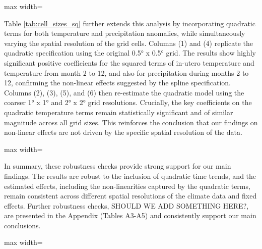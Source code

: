 \documentclass[a4paper]{article}
\begin{document}
\begin{table}[t!]
\centering
\caption{Robustness to Cell Size in Linear Fixed Effects Regression}
\label{tab:cell_sizes}
\begin{adjustbox}{max width=\linewidth}

\end{adjustbox}
\end{table}

Table \ref{tab:cell_sizes_sq} further extends this analysis by incorporating quadratic terms for both temperature and precipitation anomalies, while simultaneously varying the spatial resolution of the grid cells. Columns (1) and (4) replicate the quadratic specification using the original 0.5° x 0.5° grid.  The results show highly significant positive coefficients for the squared terms of in-utero temperature and temperature from month 2 to 12, and also for precipitation during months 2 to 12, confirming the non-linear effects suggested by the spline specification. Columns (2), (3), (5), and (6) then re-estimate the quadratic model using the coarser 1° x 1° and 2° x 2° grid resolutions. Crucially, the key coefficients on the quadratic temperature terms remain statistically significant and of similar magnitude across all grid sizes. This reinforces the conclusion that our findings on non-linear effects are not driven by the specific spatial resolution of the data.


\begin{table}[t!]
\centering
\caption{Robustness to Cell Size in Quadratic Fixed Effects Regression}
\label{tab:cell_sizes_sq}
\begin{adjustbox}{max width=\linewidth}

\end{adjustbox}
\end{table}


In summary, these robustness checks provide strong support for our main findings. The results are robust to the inclusion of quadratic time trends, and the estimated effects, including the non-linearities captured by the quadratic terms, remain consistent across different spatial resolutions of the climate data and fixed effects. Further robustness checks, SHOULD WE ADD SOMETHING HERE?, are presented in the Appendix (Tables A3-A5) and consistently support our main conclusions.


\begin{table}[t!]
\centering
\caption{Absolute Deviations Linear Fixed Effects Regression}
\label{tab:absdiff}
\begin{adjustbox}{max width=\linewidth}

\end{adjustbox}
\end{table}
\end{document}
